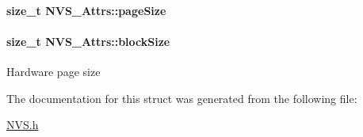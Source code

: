 \paragraph[{page\+Size}]{\setlength{\rightskip}{0pt plus 5cm}size\+\_\+t N\+V\+S\+\_\+\+Attrs\+::page\+Size}\label{struct_n_v_s___attrs_a57112fee0ce3701ebee1b96b50638e8c}
\paragraph[{block\+Size}]{\setlength{\rightskip}{0pt plus 5cm}size\+\_\+t N\+V\+S\+\_\+\+Attrs\+::block\+Size}\label{struct_n_v_s___attrs_a2fd12e8a91495037a43bf409c0ae6435}
Hardware page size 

The documentation for this struct was generated from the following file\+:\begin{DoxyCompactItemize}
\item 
\hyperlink{_n_v_s_8h}{N\+V\+S.\+h}\end{DoxyCompactItemize}
